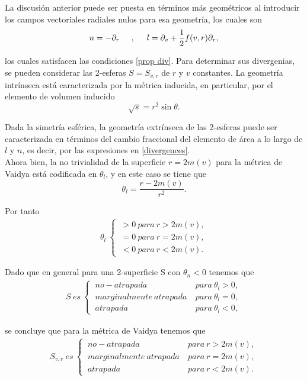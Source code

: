 \documentclass{article}
\numberwithin{equation}{section}
\theoremstyle{definition}
\begin{document}
La discusión anterior puede ser puesta en términos más geométricos al introducir los campos vectoriales radiales nulos para esa geometría, los cuales son
\begin{equation*}
n = -\partial_r \hspace{.5cm},\hspace{.5cm} l = \partial_v + \frac{1}{2}f(v,r)\partial_r,
\end{equation*}

los cuales satisfacen las condiciones \eqref{prop div}. Para determinar sus divergenias, se pueden considerar las 2-esferas $S = S_{v,r}$ de $r$ y $v$ constantes. La geometría intrínseca está caracterizada por la métrica inducida, en particular, por el elemento de volumen inducido
\begin{equation*}
\sqrt{s} = r^2 \sin \theta.
\end{equation*}

Dada la simetría esférica, la geometría extrínseca de las 2-esferas puede ser caracterizada en términos del cambio fraccional del elemento de área a lo largo de $l$ y $n$, es decir, por las expresiones en \eqref{divergences}.\\

Ahora bien, la no trivialidad de la superficie $r = 2m(v)$ para la métrica de Vaidya está codificada en $\theta_l$, y en este caso se tiene que
\begin{equation*}
\theta_l = \frac{r - 2m(v)}{r^2}.
\end{equation*} 

Por tanto
\begin{align*}
\theta_l\ 
\begin{cases}
\ >0\ para\ r>2m(v),\\
\ =0\ para\ r=2m(v),\\
\ <0\ para\ r<2m(v).
\end{cases}
\end{align*}

Dado que en general para una 2-superficie S con $\theta_n < 0$ tenemos que 
\begin{align*}
S\ es\ 
\begin{cases}
\ no-atrapada\ & para\ \theta_l>0,\\
\ marginalmente\ atrapada\ & para\ \theta_l=0,\\
\ atrapada\ & para\ \theta_l<0,
\end{cases}
\end{align*}

se concluye que para la métrica de Vaidya tenemos que 
\begin{align*}
S_{v,r}\ es\ 
\begin{cases}
\ no-atrapada\ & para\ r>2m(v),\\
\ marginalmente\ atrapada\ & para\ r=2m(v),\\
\ atrapada\ & para\ r<2m(v).
\end{cases}
\end{align*}
\end{document}
